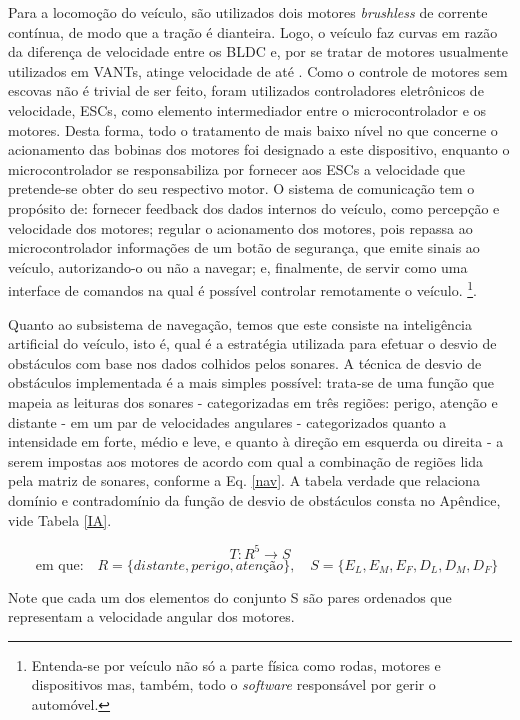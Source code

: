 Para a locomoção do veículo, são utilizados dois motores \textit{brushless} de corrente
contínua, de modo que a tração é dianteira. Logo, o veículo faz curvas em razão da diferença
de velocidade entre os BLDC e, por se tratar de motores usualmente utilizados em VANTs,
atinge velocidade de até  .
Como o controle de motores sem escovas não é trivial de
ser feito, foram utilizados controladores eletrônicos de velocidade, ESCs, como elemento
intermediador entre o microcontrolador e os motores. Desta forma, todo o tratamento de
mais baixo nível no que concerne o acionamento das bobinas dos motores foi designado
a este dispositivo, enquanto o microcontrolador se responsabiliza por fornecer aos ESCs
a velocidade que pretende-se obter do seu respectivo motor.
O sistema de comunicação tem o propósito de: fornecer feedback dos dados internos
do veículo, como percepção e velocidade dos motores; regular o acionamento dos motores,
pois repassa ao microcontrolador informações de um botão de segurança, que emite sinais
ao veículo, autorizando-o ou não a navegar; e, finalmente, de servir como uma interface de
comandos na qual é possível controlar remotamente o veículo.
\footnote{Entenda-se por veículo não só a parte física como rodas, motores e dispositivos mas, também, todo o \textit{software} responsável por gerir 
o automóvel.}.

Quanto ao subsistema de navegação, temos que este consiste na inteligência artificial
do veículo, isto é, qual é a estratégia utilizada para efetuar o desvio de obstáculos com
base nos dados colhidos pelos sonares. A técnica de desvio de obstáculos implementada
é a mais simples possível: trata-se de uma função que mapeia as leituras dos sonares -
categorizadas em três regiões: perigo, atenção e distante - em um par de velocidades
angulares - categorizados quanto a intensidade em forte, médio e leve, e quanto à direção
em esquerda ou direita - a serem impostas aos motores de acordo com qual a combinação
de regiões lida pela matriz de sonares, conforme a Eq. \ref{nav}. A tabela verdade que relaciona
domínio e contradomínio da função de desvio de obstáculos consta no Apêndice, vide Tabela \ref{IA}.

\begin{equation}
\label{nav}
T:R^5 \rightarrow S
\end{equation}
$$\quad \textrm{em que:} \quad R=\{distante, perigo, atenção\}, \quad S=\{E_L, E_M, E_F, D_L, D_M, D_F\}$$

Note que cada um dos elementos do conjunto S são pares ordenados que representam a
velocidade angular dos motores.

